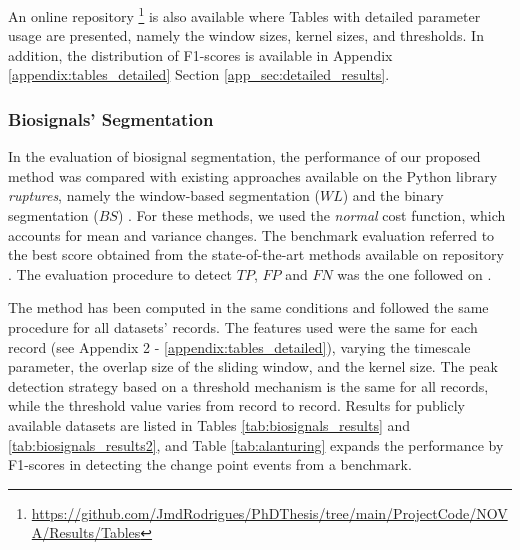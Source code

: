 An online repository \footnote{\url{https://github.com/JmdRodrigues/PhDThesis/tree/main/ProjectCode/NOVA/Results/Tables}} is also available where Tables with detailed parameter usage are presented, namely the window sizes, kernel sizes, and thresholds. In addition, the distribution of F1-scores is available in Appendix \ref{appendix:tables_detailed} Section \ref{app_sec:detailed_results}. 


\subsubsection{Biosignals' Segmentation}

In the evaluation of biosignal segmentation, the performance of our proposed method was compared with existing approaches available on the Python library \textit{ruptures}, namely the window-based segmentation ($WL$) and the binary segmentation ($BS$) \cite{review_2}. For these methods, we used the \textit{normal} cost function, which accounts for mean and variance changes. The benchmark evaluation referred to the best score obtained from the state-of-the-art methods available on repository  \cite{cpd_alan}. The evaluation procedure to detect $TP$, $FP$ and $FN$ was the one followed on \cite{cpd_alan}.

The method has been computed in the same conditions and followed the same procedure for all datasets' records. The features used were the same for each record (see Appendix 2 - \ref{appendix:tables_detailed}), varying the timescale parameter, the overlap size of the sliding window, and the kernel size. The peak detection strategy based on a threshold mechanism is the same for all records, while the threshold value varies from record to record. Results for publicly available datasets are listed in Tables \ref{tab:biosignals_results} and \ref{tab:biosignals_results2}, and Table \ref{tab:alanturing} expands the performance by F1-scores in detecting the change point events from a benchmark.

